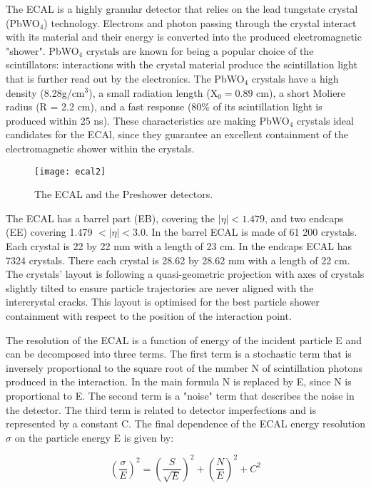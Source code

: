 \begin{normalsize}
The ECAL is a highly granular detector that relies on the lead tungstate crystal (PbWO$_4$) technology. Electrons and photon passing through the crystal interact with its material and their energy is converted into the produced electromagnetic "shower". PbWO$_4$ crystals are known for being a popular choice of the scintillators: interactions with the crystal material produce the scintillation light that is further read out by the electronics. The PbWO$_4$ crystals have a high density (8.28g/cm$^3$), a small radiation length (X$_0 = 0.89$ cm), a short Moliere radius (R = 2.2 cm), and a fast response (80$\%$ of its scintillation light is produced within 25 ns). These characteristics are making PbWO$_4$ crystals ideal candidates for the ECAl, since they guarantee an excellent containment of the electromagnetic shower within the crystals. 

\begin{figure}[H]
  \centering
  \texttt{[image: ecal2]}
  \caption[The ECAL]{The ECAL and the Preshower detectors.}
  \label{ecal2}
\end{figure}

The ECAL has a barrel part (EB), covering the $|\eta|< 1.479$, and two endcaps (EE) covering 1.479 $< |\eta |  < 3.0$.
In the barrel ECAL is made of 61 200 crystals. Each crystal is 22 by 22 mm with a length of 23 cm. In the endcaps ECAL has 7324 crystals. There each crystal is 28.62 by 28.62 mm with a length of 22 cm. The crystals' layout is following a quasi-geometric projection with axes of crystals slightly tilted to ensure particle trajectories are never aligned with the intercrystal cracks. This layout is optimised for the best particle shower containment with respect to the position of the interaction point.  


The resolution of the ECAL is a function of energy of the incident particle E and can be decomposed into three terms. The first term is a stochastic term that is inversely proportional to the square root of the number N of scintillation photons produced in the interaction. In the main formula N is replaced by E, since N is proportional to E. The second term is a "noise" term that describes the noise in the detector.  The third term is related to detector imperfections and is represented by a constant C. The final dependence of the ECAL energy resolution $\sigma$ on the particle energy E is given by:

  
\begin{equation}
  \left(\frac{\sigma}{E}\right)^2 = \left(\frac{S}{\sqrt{E}}\right)^2 +
  \left(\frac{N}{E}\right)^2 + C^2
  \label{eq:ecal}
\end{equation}


\end{normalsize}
